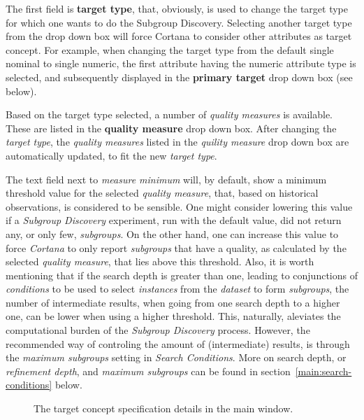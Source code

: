 \documentclass{article}
\begin{document}
The first field is {\bf target type}, that, obviously, is used to change the target type for which one wants to do the Subgroup Discovery.
Selecting another target type from the drop down box will force Cortana to consider other attributes as target concept.
For example, when changing the target type from the default single nominal to single numeric, the first attribute having the numeric attribute type is selected, and subsequently displayed in the {\bf primary target} drop down box (see below).

Based on the target type selected, a number of \emph{quality measures} is available.
These are listed in the {\bf quality measure} drop down box.
After changing the \emph{target type}, the \emph{quality measures} listed in the \emph{quility measure} drop down box are automatically updated, to fit the new \emph{target type}.

The text field next to \emph{measure minimum} will, by default, show a minimum threshold value for the selected \emph{quality measure}, that, based on historical observations, is considered to be sensible.
One might consider lowering this value if a \emph{Subgroup Discovery} experiment, run with the default value, did not return any, or only few, \emph{subgroups}.
On the other hand, one can increase this value to force \emph{Cortana} to only report \emph{subgroups} that have a quality, as calculated by the selected \emph{quality measure}, that lies above this threshold.
Also, it is worth mentioning that if the search depth is greater than one, leading to conjunctions of \emph{conditions} to be used to select \emph{instances} from the \emph{dataset} to form \emph{subgroups}, the number of intermediate results, when going from one search depth to a higher one, can be lower when using a higher threshold.
This, naturally, aleviates the computational burden of the \emph{Subgroup Discovery} process.
However, the recommended way of controling the amount of (intermediate) results, is through the \emph{maximum subgroups} setting in \emph{Search Conditions}.
More on search depth, or \emph{refinement depth}, and \emph{maximum subgroups} can be found in section~\ref{main:search-conditions} below.

\begin{figure}
\begin{center}
\centering
{}
\caption{The target concept specification details in the main window.}
\end{center}
\label{fig:targetconcept}
\end{figure}
\end{document}

